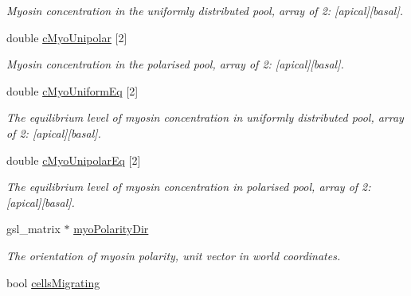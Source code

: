 \begin{DoxyCompactItemize}
\begin{DoxyCompactList}\small\item\em Myosin concentration in the uniformly distributed pool, array of 2\+: \mbox{[}apical\mbox{]}\mbox{[}basal\mbox{]}. \end{DoxyCompactList}\item 
\hypertarget{classShapeBase_a2a1e584564ef617fa1d18eb591c84a67}{}double \hyperlink{classShapeBase_a2a1e584564ef617fa1d18eb591c84a67}{c\+Myo\+Unipolar} \mbox{[}2\mbox{]}\label{classShapeBase_a2a1e584564ef617fa1d18eb591c84a67}

\begin{DoxyCompactList}\small\item\em Myosin concentration in the polarised pool, array of 2\+: \mbox{[}apical\mbox{]}\mbox{[}basal\mbox{]}. \end{DoxyCompactList}\item 
\hypertarget{classShapeBase_aa32b4675de014e09732e7ab89719e679}{}double \hyperlink{classShapeBase_aa32b4675de014e09732e7ab89719e679}{c\+Myo\+Uniform\+Eq} \mbox{[}2\mbox{]}\label{classShapeBase_aa32b4675de014e09732e7ab89719e679}

\begin{DoxyCompactList}\small\item\em The equilibrium level of myosin concentration in uniformly distributed pool, array of 2\+: \mbox{[}apical\mbox{]}\mbox{[}basal\mbox{]}. \end{DoxyCompactList}\item 
\hypertarget{classShapeBase_a59c3af9d1dcfe4749d33ba168c5bda53}{}double \hyperlink{classShapeBase_a59c3af9d1dcfe4749d33ba168c5bda53}{c\+Myo\+Unipolar\+Eq} \mbox{[}2\mbox{]}\label{classShapeBase_a59c3af9d1dcfe4749d33ba168c5bda53}

\begin{DoxyCompactList}\small\item\em The equilibrium level of myosin concentration in polarised pool, array of 2\+: \mbox{[}apical\mbox{]}\mbox{[}basal\mbox{]}. \end{DoxyCompactList}\item 
\hypertarget{classShapeBase_afc91612adf1d146a48767756f38d1152}{}gsl\+\_\+matrix $\ast$ \hyperlink{classShapeBase_afc91612adf1d146a48767756f38d1152}{myo\+Polarity\+Dir}\label{classShapeBase_afc91612adf1d146a48767756f38d1152}

\begin{DoxyCompactList}\small\item\em The orientation of myosin polarity, unit vector in world coordinates. \end{DoxyCompactList}\item 
\hypertarget{classShapeBase_a9bac41508f4c7a34d7f2a811ba4baa7c}{}bool \hyperlink{classShapeBase_a9bac41508f4c7a34d7f2a811ba4baa7c}{cells\+Migrating}\label{classShapeBase_a9bac41508f4c7a34d7f2a811ba4baa7c}


\end{DoxyCompactItemize}
